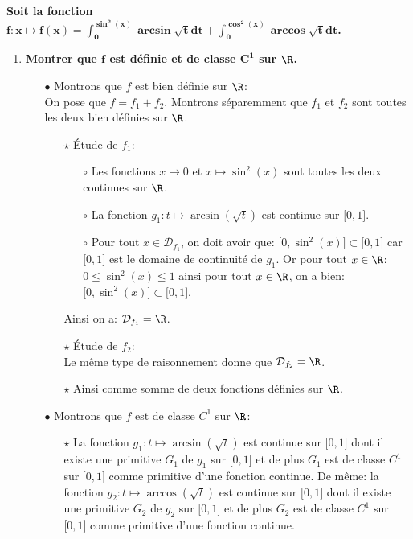 \documentclass[a4paper, 11pt,reqno]{article}
\begin{document}
\begin{correction}
	\noindent \textbf{Soit la fonction $\mathbf{f: x\mapsto f(x)=\int_0^{\sin^2{(x)}} \arcsin{\sqrt{t}}dt +  \int_0^{\cos^2{(x)}} \arccos{\sqrt{t}}dt }$.}
	\begin{enumerate}
		\item \textbf{ Montrer que $\mathbf{f}$ est d\'efinie et de classe $\mathbf{C^1}$ sur $\mathbf{\R}$.}
		      \begin{itemize}
			      \item[$\bullet$] Montrons que $f$ est bien d\'efinie sur $\R$:\\
			            \noindent On pose que $f=f_1+f_2$. Montrons s\'eparemment que $f_1$ et $f_2$ sont toutes les deux bien d\'efinies sur $\R$.
			            \begin{itemize}
				            \item[$\star$] \'Etude de $f_1$:
				                  \begin{itemize}
					                  \item[$\circ$] Les fonctions $x\mapsto 0$ et $x\mapsto \sin^2{(x)}$ sont toutes les deux continues sur $\R$.
					                  \item[$\circ$]  La fonction $g_1: t\mapsto \arcsin{(\sqrt{t})}$ est continue sur $\lbrack 0,1\rbrack$.
					                  \item[$\circ$]  Pour tout $x\in\mathcal{D}_{f_1}$, on doit avoir que: $\lbrack 0,\sin^2{(x)}\rbrack\subset \lbrack 0,1\rbrack$ car $\lbrack 0,1\rbrack$ est le domaine de continuit\'e de $g_1$. Or pour tout $x\in\R$: $0\leq \sin^2{(x)}\leq 1$ ainsi pour tout $x\in\R$, on a bien: $\lbrack 0,\sin^2{(x)}\rbrack\subset \lbrack 0,1\rbrack$.
				                  \end{itemize}
				                  Ainsi on a: $\mathcal{D}_{f_1}=\R$.
				            \item[$\star$] \'Etude de $f_2$:\\
				                  \noindent Le m\^{e}me type de raisonnement donne que $\mathcal{D}_{f_2}=\R$.
				            \item[$\star$] Ainsi  comme somme de deux fonctions d\'efinies sur $\R$.
			            \end{itemize}
			      \item[$\bullet$] Montrons que $f$ est de classe $C^1$ sur $\R$:
			            \begin{itemize}
				            \item[$\star$] La fonction $g_1: t\mapsto \arcsin{(\sqrt{t})}$ est continue sur $\lbrack 0,1\rbrack$ dont il existe une primitive $G_1$ de $g_1$ sur $\lbrack 0,1\rbrack$ et de plus $G_1$ est de classe $C^1$ sur $\lbrack 0,1\rbrack$ comme primitive d'une fonction continue. De m\^{e}me: la fonction $g_2: t\mapsto \arccos{(\sqrt{t})}$ est continue sur $\lbrack 0,1\rbrack$ dont il existe une primitive $G_2$ de $g_2$ sur $\lbrack 0,1\rbrack$ et de plus $G_2$ est de classe $C^1$ sur $\lbrack 0,1\rbrack$ comme primitive d'une fonction continue.

\end{itemize}
\end{itemize}
\end{enumerate}
\end{correction}
\end{document}
